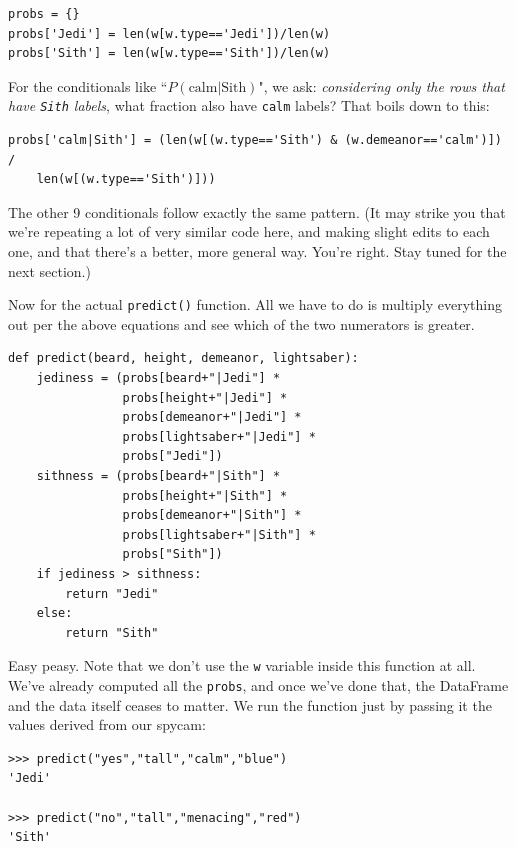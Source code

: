 \documentclass[12pt]{article}
\begin{document}
\begin{Verbatim}[fontsize=\small,samepage=true,frame=none]
probs = {}
probs['Jedi'] = len(w[w.type=='Jedi'])/len(w)
probs['Sith'] = len(w[w.type=='Sith'])/len(w)
\end{Verbatim}

For the conditionals like ``$P(\textrm{calm}|\textrm{Sith})$", we ask:
\textit{considering only the rows that have \texttt{Sith} labels}, what
fraction also have \texttt{calm} labels? That boils down to this:

\footnotesize
\begin{Verbatim}[fontsize=\small,samepage=true,frame=none]
probs['calm|Sith'] = (len(w[(w.type=='Sith') & (w.demeanor=='calm')]) /
    len(w[(w.type=='Sith')]))
\end{Verbatim}
\normalsize

The other 9 conditionals follow exactly the same pattern. (It may strike you
that we're repeating a lot of very similar code here, and making slight edits
to each one, and that there's a better, more general way. You're right. Stay
tuned for the next section.)

\pagebreak

Now for the actual \texttt{predict()} function. All we have to do is multiply
everything out per the above equations and see which of the two numerators is
greater.

\begin{Verbatim}[fontsize=\small,samepage=true,frame=none]
def predict(beard, height, demeanor, lightsaber):
    jediness = (probs[beard+"|Jedi"] *
                probs[height+"|Jedi"] *
                probs[demeanor+"|Jedi"] *
                probs[lightsaber+"|Jedi"] *
                probs["Jedi"])
    sithness = (probs[beard+"|Sith"] *
                probs[height+"|Sith"] *
                probs[demeanor+"|Sith"] *
                probs[lightsaber+"|Sith"] *
                probs["Sith"])
    if jediness > sithness:
        return "Jedi"
    else:
        return "Sith"
\end{Verbatim}

Easy peasy. Note that we don't use the \texttt{w} variable inside this
function at all. We've already computed all the \texttt{probs}, and once we've
done that, the DataFrame and the data itself ceases to matter. We run the
function just by passing it the values derived from our spycam:

\begin{Verbatim}[fontsize=\small,samepage=true,frame=none]
>>> predict("yes","tall","calm","blue")
'Jedi'

>>> predict("no","tall","menacing","red")
'Sith'
\end{Verbatim}
\end{document}
